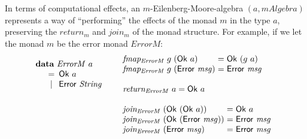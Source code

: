 \documentclass{jfp1}
\newcommand{\kw}[1]{\textbf{#1}}
\begin{document}
In terms of computational effects, an $m$-Eilenberg-Moore-algebra $(a,
\mathit{mAlgebra})$ represents a way of ``performing'' the effects of
the monad $m$ in the type $a$, preserving the $\mathit{return}_m$ and
$\mathit{join_m}$ of the monad structure. For example, if we let the
monad $m$ be the error monad $\mathit{ErrorM}$:
\begin{displaymath}
  \begin{array}{ll}
    \begin{array}[t]{l}
      \kw{data}~\mathit{ErrorM}~a \\
      \quad
      \begin{array}{c@{\hspace{0.5em}}l}
        = & \mathsf{Ok}~a \\
        | & \mathsf{Error}~\mathit{String}
      \end{array}
    \end{array}
    &
    \begin{array}[t]{l}
      \begin{array}{@{}l@{\hspace{0.3em}}l@{\hspace{0.3em}}l@{\hspace{0.3em}}c@{\hspace{0.3em}}l}
        \mathit{fmap_{ErrorM}}&g&(\mathsf{Ok}~a) &=& \mathsf{Ok}~(g~a) \\
        \mathit{fmap_{ErrorM}}&g&(\mathsf{Error}~\mathit{msg}) &=& \mathsf{Error}~\mathit{msg} \\
      \end{array} \\
      \\
      \mathit{return_{ErrorM}}~a = \mathsf{Ok}~a \\
      \\
      \begin{array}{@{}l@{\hspace{0.3em}}l@{\hspace{0.3em}}c@{\hspace{0.3em}}l}
        \mathit{join_{ErrorM}}&(\mathsf{Ok}~(\mathsf{Ok}~a)) &=& \mathsf{Ok}~a \\
        \mathit{join_{ErrorM}}&(\mathsf{Ok}~(\mathsf{Error}~\mathit{msg})) &=& \mathsf{Error}~\mathit{msg} \\
        \mathit{join_{ErrorM}}&(\mathsf{Error}~\mathit{msg}) &=& \mathsf{Error}~\mathit{msg}
      \end{array}
    \end{array}
  \end{array}
\end{displaymath}
\end{document}
